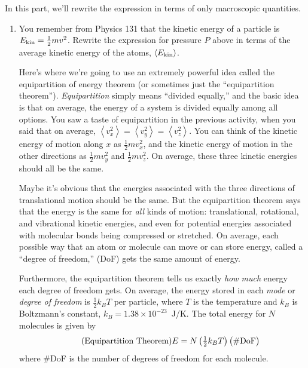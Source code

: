 In this part, we'll rewrite the expression in terms of only macroscopic quantities.  

\begin{enumerate}[labparts]

\item You remember from Physics 131 that the kinetic energy of a particle is $E_{\rm kin} = \frac{1}{2}mv^2$.  Rewrite the expression for pressure $P$ above in terms of the average kinetic energy of the atoms, $\left<  E_{\rm kin} \right>$.
\answerspace{0.6in}

Here's where we're going to use an extremely powerful idea called the equipartition of energy theorem (or sometimes just the ``equipartition theorem'').  \textit{Equipartition} simply means ``divided equally,'' and the basic idea is that on average, the energy of a system is divided equally among all options.
You saw a taste of equipartition in the previous activity, when you said that on average, $ \left< v_x^2 \right >= \left< v_y^2 \right > = \left< v_z^2 \right > $.  You can think of the kinetic energy of motion along $x$ as 
$\frac{1}{2}mv_x^2$, and the kinetic energy of motion in the other directions as $\frac{1}{2}mv_y^2$ and $\frac{1}{2}mv_z^2$.  On average, these three kinetic energies should all be the same.

Maybe it's obvious that the energies associated with the three directions of translational motion should be the same.  But the equipartition theorem says that the energy is the same for \textit{all} kinds of motion: translational, rotational, and vibrational kinetic energies, and even for potential energies associated with molecular bonds being compressed or stretched.  On average, each possible way that an atom or molecule can move or can store energy, called a ``degree of freedom,'' (DoF) gets the same amount of energy.

Furthermore, the equipartition theorem tells us exactly \textit{how much} energy each degree of freedom gets.  On average, the energy stored in each \textit{mode} or \textit{degree of freedom} is $\frac{1}{2}k_BT$ per particle, where $T$ is the temperature and $k_B$ is Boltzmann's constant, $k_B=1.38 \times 10^{-23}$~J/K.  The total energy for $N$ molecules is given by
\begin{equation*}
\tag{Equipartition Theorem}
\textstyle 
E=N\left(\frac{1}{2}k_BT\right)\bigl({\rm \#DoF}\bigr)
\end{equation*}
where \#DoF is the number of degrees of freedom for each molecule.


\end{enumerate}
